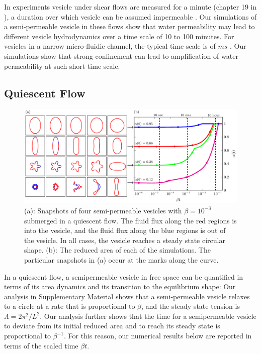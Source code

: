 \documentclass[9pt,twocolumn,twoside,lineno]{pnas-new}
\newif\ifTikz
\begin{document}
In experiments vesicle under shear flows are measured for a minute (chapter 19 in \cite{Dimova2020_GVB}), a duration over which vesicle can be assumed impermeable \cite{AbkarianViallat2005_BJ}. Our simulations of a semi-permeable vesicle
in these flows show that water permeability may lead to different vesicle hydrodynamics over a time scale of 10 to 100 minutes. 
For vesicles in a narrow micro-fluidic channel, the typical time scale is of $ms$ \cite{abk-fai-sto2006}. Our simulations show that strong confinement can lead to amplification of water permeability at such short time scale.
%

\subsection*{Quiescent Flow} 
\begin{figure}[htp]
  \centering
  \ifTikz
  
  \else
  \includegraphics{figures/relaxationComposite.pdf}
  \fi
  \caption{\label{fig:relaxationComposite} (a): Snapshots of four
  semi-permeable vesicles with $\beta = 10^{-3}$ submerged in a
  quiescent flow. The fluid flux along the red regions is into the
  vesicle, and the fluid flux along the blue regions is out of the
  vesicle. In all cases, the vesicle reaches a steady state circular
  shape. (b): The reduced area of each of the simulations. The
  particular snapshots in (a) occur at the marks along the curve.}
\end{figure}
In a quiescent flow, a semipermeable vesicle in free space can be quantified in terms of its area dynamics and its transition to the equilibrium shape:
Our analysis in Supplementary Material shows that a semi-permeable vesicle
relaxes to a circle at a rate that is proportional to $\beta$, and the
steady state tension is $\Lambda = 2\pi^2/L^2$. Our analysis further shows that the time for a semipermeable
vesicle to deviate from its initial reduced area and to reach its steady
state is proportional to $\beta^{-1}$. For this reason, our numerical
results below are reported in terms of the scaled time $\beta t$.
\end{document}
